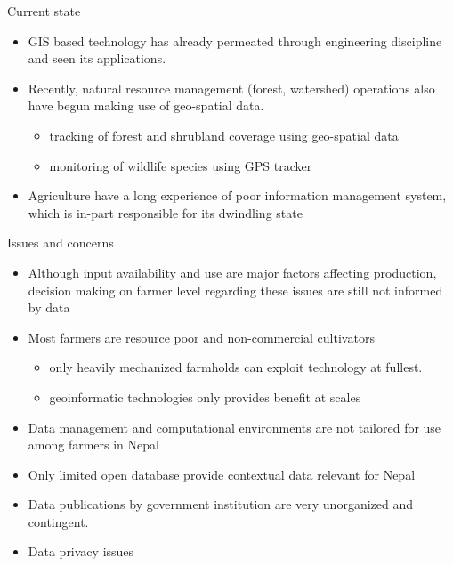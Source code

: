 \documentclass[11pt,dvipsnames,ignorenonframetext,aspectratio=169]{beamer}
\providecommand{\tightlist}{%
  \setlength{\itemsep}{0pt}\setlength{\parskip}{0pt}}
\begin{document}
\begin{frame}{Current state}
\protect\hypertarget{current-state}{}
\begin{itemize}
\tightlist
\item
  GIS based technology has already permeated through engineering
  discipline and seen its applications.
\item
  Recently, natural resource management (forest, watershed) operations
  also have begun making use of geo-spatial data.

  \begin{itemize}
  \tightlist
  \item
    tracking of forest and shrubland coverage using geo-spatial data
  \item
    monitoring of wildlife species using GPS tracker
  \end{itemize}
\item
  Agriculture have a long experience of poor information management
  system, which is in-part responsible for its dwindling state
\end{itemize}
\end{frame}

\begin{frame}{Issues and concerns}
\protect\hypertarget{issues-and-concerns}{}
\begin{itemize}
\tightlist
\item
  Although input availability and use are major factors affecting
  production, decision making on farmer level regarding these issues are
  still not informed by data
\item
  Most farmers are resource poor and non-commercial cultivators

  \begin{itemize}
  \tightlist
  \item
    only heavily mechanized farmholds can exploit technology at fullest.
  \item
    geoinformatic technologies only provides benefit at scales
  \end{itemize}
\item
  Data management and computational environments are not tailored for
  use among farmers in Nepal
\item
  Only limited open database provide contextual data relevant for Nepal
\item
  Data publications by government institution are very unorganized and
  contingent.
\item
  Data privacy issues
\end{itemize}
\end{frame}
\end{document}
